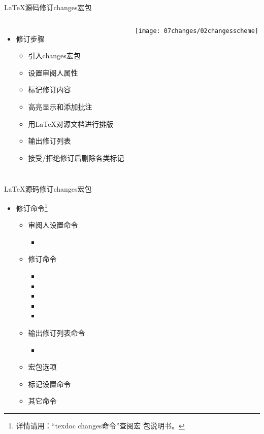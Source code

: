 \documentclass[fontset = none, t, aspectratio=169]{ctexbeamer}
\begin{document}
\begin{frame}{\LaTeX 源码修订}{changes宏包}
  \begin{columns}[T]
    \begin{itemize}\itemsep=8pt
    \item 修订步骤
      \begin{itemize}\itemsep=10pt
      \item 引入changes宏包
      \item 设置审阅人属性
      \item 标记修订内容
      \item 高亮显示和添加批注
      \item 用\LaTeX 对源文档进行排版
      \item 输出修订列表
      \item 接受/拒绝修订后删除各类标记
      \end{itemize}
    \end{itemize}
     \centering
    \texttt{[image: 07changes/02changesscheme]}        
  \end{columns}
\end{frame}

\begin{frame}{\LaTeX 源码修订}{changes宏包}
  \begin{itemize}%
  \item 修订命令\footnote[frame,1]{详情请用：\enquote{\alert{texdoc changes}命令}查阅宏
      包说明书。}
    \begin{itemize}%
    \item 审阅人设置命令
      \begin{itemize}
      \item {}
      \end{itemize}
    \item 修订命令
      \begin{itemize}
      \item {}
      \item {}
      \item {}  
      \item {}
      \item {}  
      \end{itemize}
    \item 输出修订列表命令
      \begin{itemize}
      \item \texinline{\listofchanges[style=<style>, title=<title>, show=<type>]}
      \end{itemize}
    \item 宏包选项
    \item 标记设置命令
    \item 其它命令
    \end{itemize}
  \end{itemize}
\end{frame}
\end{document}
